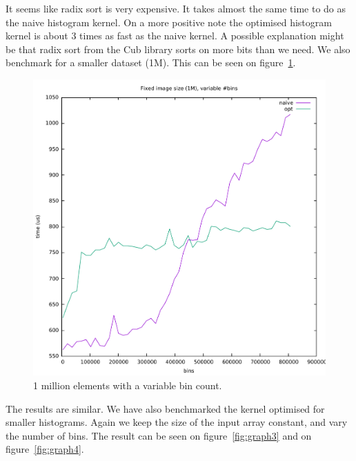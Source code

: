\documentclass[12pt, a4paper, hidelinks]{article}
\begin{document}
It seems like radix sort is very expensive.
It takes almost the same time to do as the naive histogram kernel.
On a more positive note the optimised histogram kernel is about 3 times as
fast as the naive kernel. A possible explanation might be that radix sort
from the Cub library sorts on more bits than we need. We also benchmark
for a smaller dataset (1M). This can be seen on figure~\ref{fig:graph2}.

\begin{figure}[htpb]
    \centering
    \includegraphics[width=0.6\linewidth]{img/graphs/1M-varbins.pdf}
    \caption{1 million elements with a variable bin count.}
    \label{fig:graph2}
\end{figure}

The results are similar.
We have also benchmarked the kernel optimised for smaller histograms. Again we keep the size of the input array constant, and vary the number of bins. The result can be seen on figure~\ref{fig:graph3} and on figure~\ref{fig:graph4}.
\end{document}
